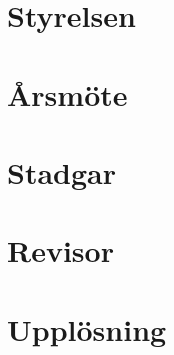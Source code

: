 \documentclass[a4paper,11pt]{article}
\begin{document}
\section{Styrelsen}



\section{Årsmöte}







\section{Stadgar}


\section{Revisor}


\section{Upplösning}




\end{document}
